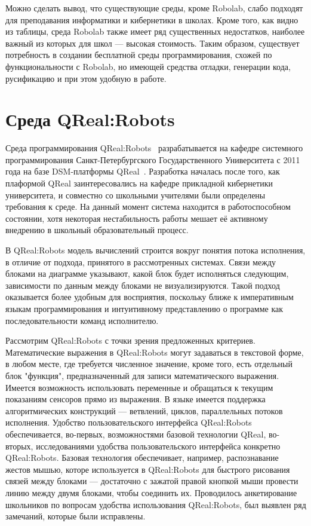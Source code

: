\documentclass[a4paper]{article}
\begin{document}
Можно сделать вывод, что существующие среды, кроме Robolab, слабо подходят для преподавания информатики и кибернетики в школах. Кроме того, как видно из таблицы, среда Robolab также имеет ряд существенных недостатков, наиболее важный из которых для школ --- высокая стоимость. Таким образом, существует потребность в создании бесплатной среды программирования, схожей по функциональности с Robolab, но имеющей средства отладки, генерации кода, русификацию и при этом удобную в работе.

\section{Среда QReal:Robots}
Среда программирования QReal:Robots~\cite{robots} разрабатывается на кафедре системного программирования Санкт-Петербургского Государственного Университета с 2011 года на базе DSM-платформы QReal~\cite{qReal}. Разработка началась после того, как плаформой QReal заинтересовались на кафедре прикладной кибернетики университета, и совместно со школьными учителями были определены требования к среде. На данный момент система находится в работоспособном состоянии, хотя некоторая нестабильность работы мешает её активному внедрению в школьный образовательный процесс. 

В QReal:Robots модель вычислений строится вокруг понятия потока исполнения, в отличие от подхода, принятого в рассмотренных системах. Связи между блоками на диаграмме указывают, какой блок будет исполняться следующим, зависимости по данным между блоками не визуализируются. Такой подход оказывается более удобным для восприятия, поскольку ближе к императивным языкам программирования и интуитивному представлению о программе как последовательности команд исполнителю. 

Рассмотрим QReal:Robots с точки зрения предложенных критериев. Математические выражения в QReal:Robots могут задаваться в текстовой форме, в любом месте, где требуется численное значение, кроме того, есть отдельный блок "функция", предназначенный для записи математического выражения. Имеется возможность использовать переменные и обращаться к текущим показаниям сенсоров прямо из выражения. В языке имеется поддержка алгоритмических конструкций --- ветвлений, циклов, параллельных потоков исполнения. Удобство пользовательского интерфейса QReal:Robots обеспечивается, во-первых, возможностями базовой технологии QReal, во-вторых, исследованиями удобства пользовательского интерфейса конкретно QReal:Robots. Базовая технология обеспечивает, например, распознавание жестов мышью, которе используется в QReal:Robots для быстрого рисования связей между блоками --- достаточно с зажатой правой кнопкой мыши провести линию между двумя блоками, чтобы соединить их. Проводилось анкетирование школьников по вопросам удобства использования QReal:Robots, был выявлен ряд замечаний, которые были исправлены.
\end{document}
